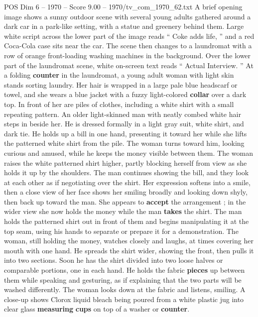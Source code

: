 \begin{textsample}{POS Dim 6 – 1970 – Score 9.00 – 1970/tv\_com\_1970\_62.txt}  \label{ex:f6_pos_047}
A brief opening image shows a sunny outdoor scene with several young adults gathered around a dark car in a park-like setting, with a statue and greenery behind them.
Large white script across the lower part of the image reads “ Coke adds life, ” and a red Coca-Cola case sits near the car.
The scene then changes to a laundromat with a row of orange front-loading washing machines in the background.
Over the lower part of the laundromat scene, white on-screen text reads “ Actual Interview. ” At a folding \textbf{counter} in the laundromat, a young adult woman with light skin stands sorting laundry.
Her hair is wrapped in a large pale blue headscarf or towel, and she wears a blue jacket with a fuzzy light-colored \textbf{collar} over a dark top.
In front of her are piles of clothes, including a white shirt with a small repeating pattern.
An older light-skinned man with neatly combed white hair steps in beside her.
He is dressed formally in a light gray suit, white shirt, and dark tie.
He holds up a bill in one hand, presenting it toward her while she lifts the patterned white shirt from the pile.
The woman turns toward him, looking curious and amused, while he keeps the money visible between them.
The woman raises the white patterned shirt higher, partly blocking herself from view as she holds it up by the shoulders.
The man continues showing the bill, and they look at each other as if negotiating over the shirt.
Her expression softens into a smile, then a close view of her face shows her smiling broadly and looking down shyly, then back up toward the man.
She appears to \textbf{accept} the arrangement ; in the wider view she now holds the money while the man \textbf{takes} the shirt.
The man holds the patterned shirt out in front of them and begins manipulating it at the top seam, using his hands to separate or prepare it for a demonstration.
The woman, still holding the money, watches closely and laughs, at times covering her mouth with one hand.
He spreads the shirt wider, showing the front, then pulls it into two sections.
Soon he has the shirt divided into two loose halves or comparable portions, one in each hand.
He holds the fabric \textbf{pieces} up between them while speaking and gesturing, as if explaining that the two parts will be washed differently.
The woman looks down at the fabric and listens, smiling.
A close-up shows Clorox liquid bleach being poured from a white plastic jug into clear glass \textbf{measuring} \textbf{cups} on top of a washer or \textbf{counter}.

\end{textsample}
